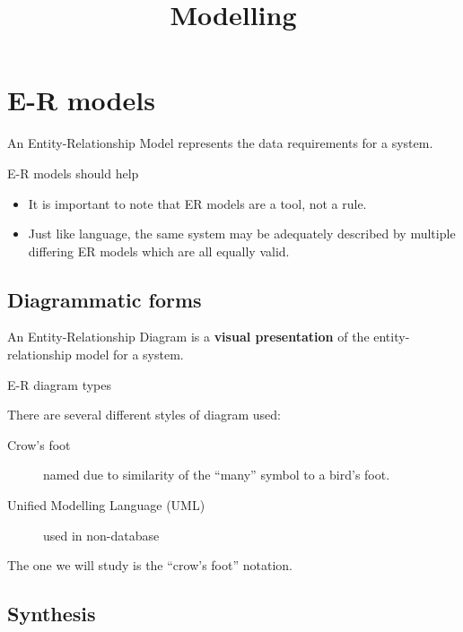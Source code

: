 \documentclass[slides]{pgnotes}
\title{Modelling}
\begin{document}
\maketitle

\tableofcontents

\section{E-R models}
\label{e-r-models}

An Entity-Relationship Model represents the data requirements for a
system.

\begin{redbox}{E-R models should help}
\begin{itemize}
\item It is important to note that ER models are a tool, not a rule.
\item Just like language, the same system may be adequately described by
multiple differing ER models which are all equally valid.
\end{itemize}
\end{redbox}

\subsection{Diagrammatic forms}
\label{diagrammatic-forms}

An Entity-Relationship Diagram is a \textbf{visual presentation} of the
entity-relationship model for a system.

\begin{greenbox}{E-R diagram types}

There are several different styles of diagram used:

\begin{description}
\item[Crow's foot]
  named due to similarity of the ``many'' symbol to a bird's foot.
\item[Unified Modelling Language (UML)]
  used in non-database
\end{description}

\end{greenbox}

The one we will study is the ``crow's foot'' notation.


\subsection{Synthesis}
\label{synthesis}
\end{document}
